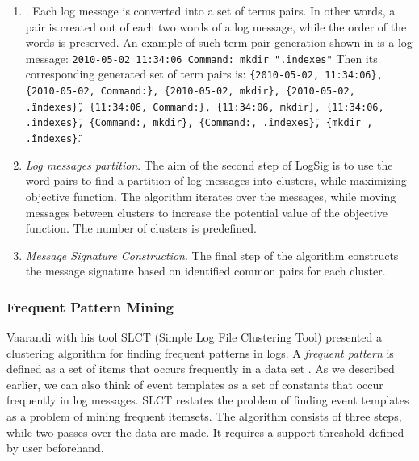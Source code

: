     \begin{enumerate}
        \item {}. Each log message is converted into a set of terms pairs. In other words, a pair is created out of each two words of a log message, while the order of the words is preserved. An example of such term pair generation shown in \cite{logsig2011} is a log message: \texttt{2010-05-02 11:34:06 Command: mkdir ".indexes"} Then its corresponding generated set of term pairs is: \texttt{\{2010-05-02, 11:34:06\}, \{2010-05-02, Command:\}, \{2010-05-02, mkdir\}, \{2010-05-02, \".indexes\" \}, \{11:34:06, Command:\}, \{11:34:06, mkdir\}, \{11:34:06, \".indexes\"\}, \{Command:, mkdir\}, \{Command:, \".indexes\"\}, \{mkdir , \".indexes\"\}}.

        \item \textit{Log messages partition}. The aim of the second step of LogSig is to use the word pairs to find a partition of log messages into clusters, while maximizing objective function. The algorithm iterates over the messages, while moving messages between clusters to increase the potential value of the objective function. The number of clusters is predefined. 
        
        \item \textit{Message Signature Construction}. The final step of the algorithm constructs the message signature based on identified common pairs for each cluster.
    \end{enumerate}
    
    \subsubsection*{Frequent Pattern Mining} 
    Vaarandi with his tool SLCT (Simple Log File Clustering Tool) \cite{vaarandi2003} presented a clustering algorithm for finding frequent patterns in logs. A \textit{frequent pattern} is defined as a set of items that occurs frequently in a data set \cite{zhlhxzl2018}. As we described earlier, we can also think of event templates as a set of constants that occur frequently in log messages. SLCT restates the problem of finding event templates as a problem of mining frequent itemsets. The algorithm consists of three steps, while two passes over the data are made. It requires a support threshold defined by user beforehand.
   
